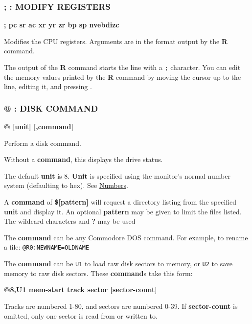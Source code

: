 \subsubsection{; : MODIFY REGISTERS}
\begin{description}[leftmargin=2cm,style=nextline]
\item [Format:] {\bf ; pc sr ac xr yr zr bp sp nvebdizc}
\item [Usage:] Modifies the CPU registers. Arguments are in the format output by the {\bf R} command.

\item [Remarks:] The output of the {\bf R} command starts the line with a {\tt ;} character. You can edit the memory values printed by the {\bf R} command by moving the cursor up to the line, editing it, and pressing .

\end{description}


\subsubsection{@ : DISK COMMAND}
\begin{description}[leftmargin=2cm,style=nextline]
\item [Format:] {\bf @ [unit] [,command]}
\item [Usage:] Perform a disk command.

\item [Remarks:] Without a {\bf command}, this displays the drive status.

    The default {\bf unit} is 8. {\bf Unit} is specified using the monitor's normal number system (defaulting to hex). See \hyperref[sec:numbers]{Numbers}.

    A {\bf command} of {\bf \$[pattern]} will request a directory listing from the specified {\bf unit} and display it.  An optional {\bf pattern} may be given to limit the files listed. The wildcard characters {\bf *} and {\bf ?} may be used

    The {\bf command} can be any Commodore DOS command. For example, to rename a file: {\tt @R0:NEWNAME=OLDNAME}

    The {\bf command} can be {\tt U1} to load raw disk sectors to memory, or {\tt U2} to save memory to raw disk sectors. These {\bf command}s take this form:

    {\bf @8,U1 mem-start track sector [sector-count]}

    Tracks are numbered 1-80, and sectors are numbered 0-39. If {\bf sector-count} is omitted, only one sector is read from or written to.

\end{description}



